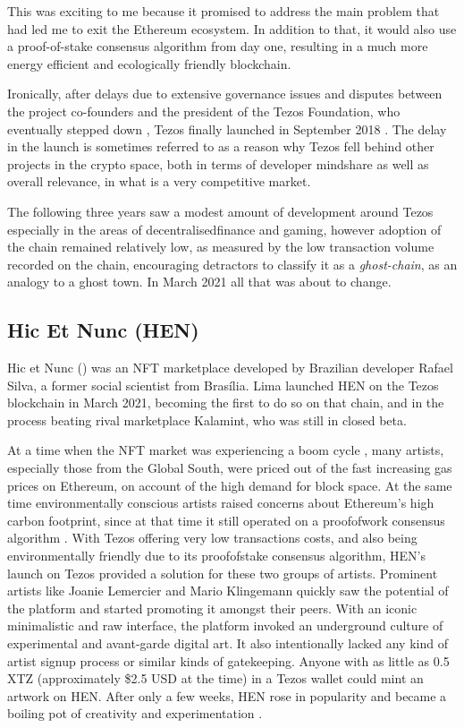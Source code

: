 This was exciting to me because it promised to address the main problem that had led me to exit the Ethereum ecosystem. In addition to that, it would also use a proof-of-stake consensus algorithm from day one, resulting in a much more energy efficient and ecologically friendly blockchain.


Ironically, after delays due to extensive governance issues and disputes between the project co-founders and the president of the Tezos Foundation, who eventually stepped down \cite{irreraExclusiveTezosFounders2017}, Tezos finally launched in September 2018 \cite{daleBillionTezosBlockchain2018}. The delay in the launch is sometimes referred to as a reason why Tezos fell behind other projects in the crypto space, both in terms of developer mindshare as well as overall relevance, in what is a very competitive market.

The following three years saw a modest amount of development around Tezos especially in the areas of \gls{decentralisedfinance} and gaming, however adoption of the chain remained relatively low, as measured by the low transaction volume recorded on the chain, encouraging detractors to classify it as a \emph{\gls{ghost-chain}}, as an analogy to a ghost town. In March 2021 all that was about to change.


\subsection*{Hic Et Nunc (HEN)}


Hic et Nunc () was an NFT marketplace developed by Brazilian developer Rafael Silva, a former social scientist from Brasília. Lima launched HEN on the Tezos blockchain in March 2021, becoming the first to do so on that chain, and in the process beating rival marketplace Kalamint, who was still in closed beta.

At a time when the NFT market was experiencing a boom cycle \cite{haywardBiggestCryptoStory2021} , many artists, especially those from the Global South, were priced out of the fast increasing gas prices on Ethereum, on account of the high demand for block space. At the same time environmentally conscious artists raised concerns about Ethereum's high carbon footprint, since at that time it still operated on a \gls{proofofwork} consensus algorithm \cite{lemercierProblemEthereumCryptoArt2021}. With Tezos offering very low transactions costs, and also being environmentally friendly due to its \gls{proofofstake} consensus algorithm, HEN's launch on Tezos provided a solution for these two groups of artists. Prominent artists like Joanie Lemercier and Mario Klingemann quickly saw the potential of the platform and started promoting it amongst their peers. With an iconic minimalistic and raw interface, the platform invoked an underground culture of experimental and avant-garde digital art. It also intentionally lacked any kind of artist signup process or similar kinds of gatekeeping. Anyone with as little as 0.5 XTZ (approximately \$2.5 USD at the time) in a Tezos wallet could mint an artwork on HEN. After only a few weeks, HEN rose in popularity and became a boiling pot of creativity and experimentation \cite{evansBrazilDIYEcofriendly2021}.

